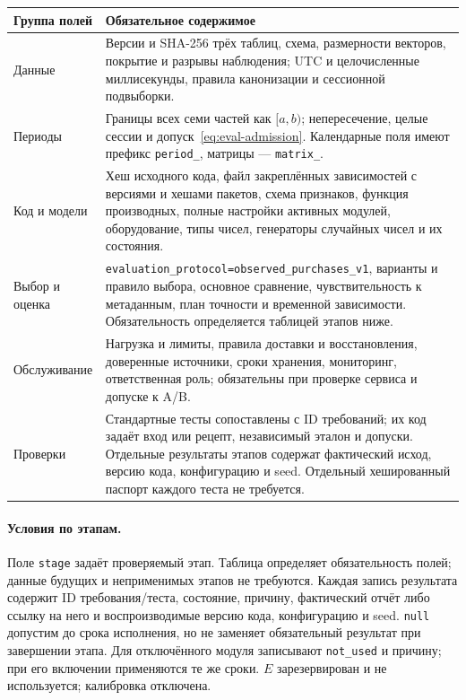 \documentclass[12pt,a4paper]{article}
\newcommand{\code}[1]{{\ttfamily\small\nolinkurl{#1}}}
\theoremstyle{plainru}
\begin{document}
\begin{longtable}{L{0.24\textwidth}L{0.66\textwidth}}
\toprule Группа полей & Обязательное содержимое \\\midrule\endhead
Данные & Версии и SHA-256 трёх таблиц, схема, размерности векторов,
покрытие и разрывы наблюдения; UTC и целочисленные миллисекунды,
правила канонизации и сессионной подвыборки. \\
Периоды & Границы всех семи частей как $[a,b)$; непересечение,
целые сессии и допуск~\eqref{eq:eval-admission}.
Календарные поля имеют префикс \code{period_}, матрицы --- \code{matrix_}. \\
Код и модели & Хеш исходного кода, файл закреплённых зависимостей
с версиями и хешами пакетов, схема признаков, функция производных,
полные настройки активных модулей, оборудование, типы чисел,
генераторы случайных чисел и их состояния. \\
Выбор и оценка & \code{evaluation_protocol=observed_purchases_v1},
варианты и правило выбора, основное сравнение,
чувствительность к метаданным, план точности и временной зависимости.
Обязательность определяется таблицей этапов ниже. \\
Обслуживание & Нагрузка и лимиты, правила доставки и восстановления,
доверенные источники, сроки хранения, мониторинг, ответственная роль;
обязательны при проверке сервиса и допуске к A/B. \\
Проверки & Стандартные тесты сопоставлены с ID требований; их код
задаёт вход или рецепт, независимый эталон и допуски. Отдельные результаты
этапов содержат фактический исход, версию кода, конфигурацию и seed.
Отдельный хешированный паспорт каждого теста не требуется. \\
\bottomrule
\end{longtable}

\paragraph{Условия по этапам.}\label{app:run-stages}
Поле \code{stage} задаёт проверяемый этап. Таблица определяет
обязательность полей; данные будущих и неприменимых этапов не требуются.
Каждая запись результата содержит ID требования/теста, состояние,
причину, фактический отчёт либо ссылку на него и воспроизводимые
версию кода, конфигурацию и seed. \code{null} допустим до срока исполнения,
но не заменяет обязательный результат при завершении этапа.
Для отключённого модуля записывают \code{not_used} и причину;
при его включении применяются те же сроки.
$E$ зарезервирован и не используется; калибровка отключена.
\end{document}
